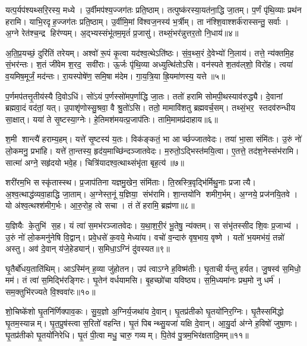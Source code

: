 यत्प॒र्यप॑श्यथ्सरि॒रस्य॒ मध्ये। उ॒र्वीमप॑श्य॒ज्जग॑तः प्रति॒ष्ठाम्। तत्पुष्क॑रस्या॒यत॑ना॒द्धि जा॒तम्। प॒र्णं पृ॑थि॒व्याः प्रथ॑न हरामि। याभि॒रदृह॒ज्जग॑तः प्रति॒ष्ठाम्। उ॒र्वीमि॒मां वि॑श्वज॒नस्य॑ भ॒र्त्रीम्। ता न॑श्शि॒वाश्शर्क॑रास्सन्तु॒ सर्वाः। अ॒ग्ने रेत॑श्च॒न्द्र हिर॑ण्यम्। अ॒द्भ्यस्संभू॑तम॒मृतं॑ प्र॒जासु॑। तथ्सं॒भर॑न्नुत्तर॒तो नि॒धाय॑॥४॥

अ॒ति॒प्र॒यच्छं॒ दुरि॑तिं तरेयम्। अश्वो॑ रू॒पं कृ॒त्वा यद॑श्व॒त्थेऽति॑ष्ठः। सं॒व॒थ्स॒रं दे॒वेभ्यो॑ नि॒लाय॑। तत्ते॒ न्य॑क्तमि॒ह सं॒भर॑न्तः। श॒तं जी॑वेम श॒रद॒ सवी॑राः। ऊ॒र्जः पृ॑थि॒व्या अध्युत्थि॑तोऽसि। वन॑स्पते श॒तव॑ल्‌शो॒ विरो॑ह। त्वया॑ व॒यमिष॒मूर्जं॒ मद॑न्तः। रा॒यस्पोषे॑ण॒ समि॒षा म॑देम। गा॒य॒त्रि॒या ह्रि॒यमा॑णस्य॒ यत्ते॥५॥

प॒र्णमप॑तत्तृ॒तीय॑स्यै दि॒वोऽधि॑। सो॑ऽयं प॒र्णस्सो॑मप॒र्णाद्धि जा॒तः। ततो॑ हरामि सोमपी॒थस्याव॑रुद्ध्यै। दे॒वानां ब्रह्मवा॒दं वद॑तां॒ यत्। उ॒पाशृ॑णोस्सु॒श्रवा॒ वै श्रु॒तो॑ऽसि। ततो॒ मामावि॑शतु ब्रह्मवर्च॒सम्। तथ्सं॒भर॒ स्तदव॑रुन्धीय सा॒क्षात्। यया॑ ते सृ॒ष्टस्या॒ग्नेः। हे॒तिमश॑मयत्प्र॒जाप॑तिः। तामि॒मामप्र॑दाहाय॥६॥

श॒मी शान्त्यै॑ हराम्य॒हम्। यत्ते॑ सृ॒ष्टस्य॑ य॒तः। विक॑ङ्कतं॒ भा आर्च्छज्जातवेदः। तया॑ भा॒सा संमि॑तः। उ॒रुं नो॑ लो॒कमनु॒ प्रभा॑हि। यत्ते॑ ता॒न्तस्य॒ हृद॑य॒माच्छि॑न्दञ्जातवेदः। म॒रुतो॒ऽद्भिस्त॑मयि॒त्वा। ए॒तत्ते॒ तद॑श॒नेस्संभ॑रामि। सात्मा॑ अग्ने॒ सहृ॑दयो भवे॒ह। चित्रि॑यादश्व॒त्थाथ्संभृ॑ता बृह॒त्य॑॥७॥

शरी॑रम॒भि सस्कृ॑तास्स्थ। प्र॒जाप॑तिना यज्ञमु॒खेन॒ संमि॑ताः। ति॒स्रस्त्रि॒वृद्भि॑र्मिथु॒नाः प्रजात्यै। अ॒श्व॒त्थाद्ध॑व्यवा॒हाद्धि जा॒ताम्। अ॒ग्नेस्त॒नूं य॒ज्ञिया॒ संभ॑रामि। शा॒न्तयो॑नि शमीग॒र्भम्। अ॒ग्नये॒ प्रज॑नयि॒तवे। यो अ॑श्व॒त्थश्श॑मीग॒र्भः। आ॒रु॒रोह॒ त्वे सचा। तं ते॑ हरामि॒ ब्रह्म॑णा॥८॥

य॒ज्ञियैः के॒तुभि॑ स॒ह। यं त्वा॑ स॒मभ॑रञ्जातवेदः। य॒था॒श॒री॒रं भू॒तेषु॒ न्य॑क्तम्। स संभृ॑तस्सीद शि॒वः प्र॒जाभ्य॑। उ॒रुं नो॑ लो॒कमनु॑नेषि वि॒द्वान्। प्रवे॒धसे॑ क॒वये॒ मेध्या॑य। वचो॑ व॒न्दारु॑ वृष॒भाय॒ वृष्णे। यतो॑ भ॒यमभ॑यं॒ तन्नो॑ अस्तु। अव॑ दे॒वान् य॑जे॒हेड्यान्॑। स॒मिधा॒ऽग्निं दु॑वस्यत॥९॥

घृ॒तैर्बो॑धय॒ताति॑थिम्। आऽस्मि॑न् ह॒व्या जु॑होतन। उप॑ त्वाऽग्ने ह॒विष्म॑तीः। घृ॒ताचीर्यन्तु हर्यत। जु॒षस्व॑ स॒मिधो॒ मम॑। तं त्वा॑ स॒मिद्भि॑रङ्गिरः। घृ॒तेन॑ वर्धयामसि। बृ॒हच्छो॑चा यविष्ठ्य। स॒मि॒ध्यमा॑नः प्रथ॒मो नु धर्म॑। सम॒क्तुभि॑रज्यते वि॒श्ववा॑रः॥१०॥

शो॒चिष्के॑शो घृ॒तनि॑र्णिक्पाव॒कः। सु॒य॒ज्ञो अ॒ग्निर्य॒जथा॑य दे॒वान्। घृ॒तप्र॑तीको घृ॒तयो॑निर॒ग्निः। घृ॒तैस्समि॑द्धो घृ॒तम॒स्यान्नम्। घृ॒त॒प्रुष॑स्त्वा स॒रितो॑ वहन्ति। घृ॒तं पिबन्थ्सु॒यजा॑ यक्षि दे॒वान्। आ॒यु॒र्दा अ॑ग्ने ह॒विषो॑ जुषा॒णः। घृ॒तप्र॑तीको घृ॒तयो॑निरेधि। घृ॒तं पी॒त्वा मधु॒ चारु॒ गव्यम्। पि॒तेव॑ पु॒त्रम॒भिर॑क्षतादि॒मम्॥११॥

